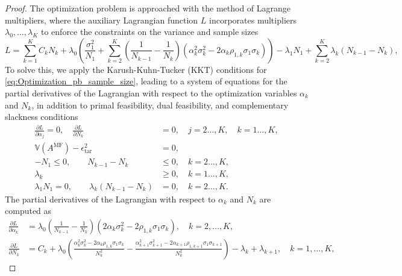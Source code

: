 \begin{proof}
The optimization problem is approached with the method of Lagrange multipliers, where the auxiliary Lagrangian function $L$ incorporates multipliers $\lambda_0,\ldots, \lambda_K$ to enforce the constraints on the variance and sample sizes
%
\[
L = \sum_{k=1}^K C_kN_k +\lambda_0 \left(\frac{\sigma_1^2}{N_1} + \sum_{k=2}^K \left(\frac{1}{N_{k-1}} - \frac{1}{N_k}\right)\left(\alpha_k^2\sigma_k^2 - 2\alpha_k\rho_{1,k}\sigma_1\sigma_k\right)\right)-\lambda_1 N_1+\sum_{k=2}^K\lambda_k(N_{k-1} - N_k),
\]
%
To solve this, we apply the Karush-Kuhn-Tucker (KKT) conditions for \eqref{eq:Optimization_pb_sample_size}, leading to a system of equations for the partial derivatives of the Lagrangian with respect to the optimization variables $\alpha_k$ and $N_k$,  in addition to  primal feasibility, dual feasibility, and complementary slackness conditions
%
\begin{align*}
\frac{\partial L}{\partial \alpha_j}=0,\quad \frac{\partial L}{\partial N_k}&=0,\quad j=2\ldots,K, \quad k=1\ldots,K,\\
\mathbb{V}\left(A^{\text{MF}}\right)- \epsilon_{\text{tar}}^2 &= 0,\\
   -N_1\le 0,\qquad N_{k-1}-N_k&\le 0, \quad k=2\ldots,K,\\
    \lambda_k &\ge 0,\quad k=1\ldots,K,\\ 
    \lambda_1 N_1=0,\qquad\lambda_k(N_{k-1}-N_k)&=0,\quad k=2\ldots,K.
\end{align*}
%
The partial derivatives of the Lagrangian with respect to $\alpha_k$ and $N_k$ are computed as
%
\begin{align*}
    \frac{\partial L}{\partial \alpha_k}&=\lambda_0\left(\frac{1}{N_{k-1}} - \frac{1}{N_k}\right)\left(2\alpha_k\sigma_k^2 - 2\rho_{1,k}\sigma_1\sigma_k\right),\quad k=2,\dots,K,\\
    \frac{\partial L}{\partial N_k}&=C_k+\lambda_0\left(\frac{\alpha_k^2\sigma_k^2 - 2\alpha_k\rho_{1,k}\sigma_1\sigma_k}{N_k^2}-\frac{\alpha_{k+1}^2\sigma_{k+1}^2 - 2\alpha_{k+1}\rho_{1,k+1}\sigma_1\sigma_{k+1}}{N_k^2}\right)-\lambda_k+\lambda_{k+1}, \quad k=1,\dots,K,
\end{align*}

\end{proof}
